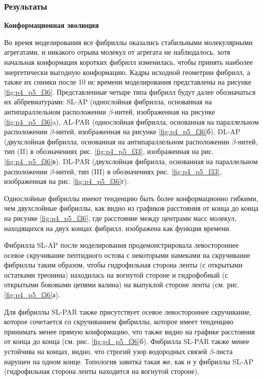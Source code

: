 \subsubsection{Результаты}

    \textbf{Конформационная эволюция}

    Во время моделирования все фибриллы оказались стабильными молекулярными агрегатами, и никакого отрыва молекул от агрегата не наблюдалось, хотя начальная конформация коротких фибрилл изменилась, чтобы принять наиболее энергетически выгодную конформацию. Кадры исходной геометрии фибрилл, а также их снимки после 10 нс времени моделирования представлены на рисунке \ref{fig:p4_p5_f36}. Представленные четыре типа фибрилл будут далее обозначаться их аббревиатурами: SL-AP (однослойная фибрилла, основанная на антипараллельном расположении $\beta$-нитей, изображенная на рисунке \ref{fig:p4_p5_f36}a), AL-PAR (однослойная фибрилла, основанная на параллельном расположении $\beta$-нитей, изображенная на рисунке \ref{fig:p4_p5_f36}б), DL-AP (двухслойная фибрилла, основанная на антипараллельном расположении $\beta$-нитей, тип (II) в обозначениях рис. \ref{fig:p4_p5_f33}, изображенная на рис. \ref{fig:p4_p5_f36}в), DL-PAR (двухслойная фибрилла, основанная на параллельном расположении $\beta$-нитей, тип (III) в обозначениях рис. \ref{fig:p4_p5_f33}, изображенная на рис. \ref{fig:p4_p5_f36}г).

    Однослойные фибриллы имеют тенденцию быть более конформационно гибкими, чем двухслойные фибриллы, как видно из графиков расстояния от конца до конца на рисунке \ref{fig:p4_p5_f36}, где расстояние между центрами масс молекул, находящихся на двух концах фибрилл, изображена как функция времени.
    
    Фибрилла SL-AP после моделирования продемонстрировала левостороннее осевое скручивание пептидного остова с некоторыми намеками на скручивание фибриллы таким образом, чтобы гидрофильная сторона ленты (с открытыми остатками треонина) находилась на вогнутой стороне и гидрофобный (с открытыми боковыми цепями валина) на выпуклой стороне ленты (см. рис. \ref{fig:p4_p5_f36}а).

    Для фибриллы SL-PAR также присутствует осевое левостороннее скручивание, которое сочетается со скручиванием фибриллы, которое имеет тенденцию принимать менее прямую конформацию, что также видно на графике расстояния от конца до конца (см. рис. \ref{fig:p4_p5_f36}б). Фибрилла SL-PAR также менее устойчива на концах, видно, что строгий узор водородных связей $\beta$-листа нарушен на одном конце. Топология завитка такая же, как и у фибриллы SL-AP (гидрофильная сторона ленты находится на вогнутой стороне).
    
